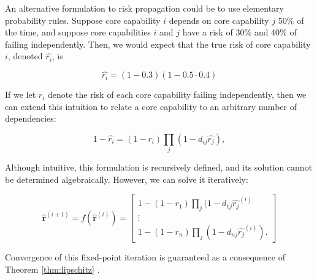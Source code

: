 \documentclass{article}
\begin{document}
An alternative formulation to risk propagation could be to use elementary probability rules. Suppose core capability $i$ depends on core capability $j$ 50\% of the time, and suppose core capabilities $i$ and $j$ have a risk of 30\% and 40\% of failing independently. Then, we would expect that the true risk of core capability $i$, denoted $\hat{r_i}$, is 

\begin{equation}
\label{prob-example}
\hat{r_i} = (1-0.3)(1-0.5\cdot 0.4)
\end{equation}

If we let $r_i$ denote the risk of each core capability failing independently, then we can extend this intuition to relate a core capability to an arbitrary number of dependencies:

\begin{equation}
\label{eqn:rel}
1-\hat{r_i} = (1-r_i)\prod_j  \left(1-d_{ij}\hat{r_j}\right),
\end{equation}

Although intuitive, this formulation is recursively defined, and its solution cannot be determined algebraically. However, we can solve it iteratively:

\begin{equation}
\mathbf{\hat{r}}^{(i+1)} = f\left(\mathbf{\hat{r}}^{(i)}\right) = \begin{bmatrix} 
1-(1-r_1)\prod_j  (1-d_{1j}\hat{r_j}^{(i)}\\
\vdots\\
1-(1-r_n)\prod_j  (1-d_{nj}\hat{r_j}^{(i)}).
\end{bmatrix}
\end{equation}

Convergence of this fixed-point iteration is guaranteed as a consequence of Theorem \ref{thm:lipschitz} \citep{linear-algebra}. 
\end{document}
